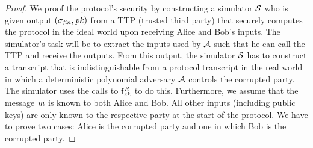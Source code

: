 \begin{proof}
    \label{prf:sig:two-party-security}
    We proof the protocol's security by constructing a simulator $\mathcal{S}$ who is given output $(\sigma_{\mathit{fin}}, \mathit{pk})$ from a TTP (trusted third party) that securely computes the protocol in the ideal world upon receiving Alice and Bob's inputs.
    The simulator's task will be to extract the inputs used by $\mathcal{A}$ such that he can call the TTP and receive the outputs.
    From this output, the simulator $\mathcal{S}$ has to construct a transcript that is indistinguishable from a protocol transcript in the real world in which a deterministic polynomial adversary $\mathcal{A}$ controls the corrupted party.
    The simulator uses the calls to $\mathsf{f}^{\mathit{R}}_{zk}$ to do this.
    Furthermore, we assume that the message $\mathit{m}$ is known to both Alice and Bob.
    All other inputs (including public keys) are only known to the respective party at the start of the protocol.
    We have to prove two cases: Alice is the corrupted party and one in which Bob is the corrupted party.
    

\end{proof}
